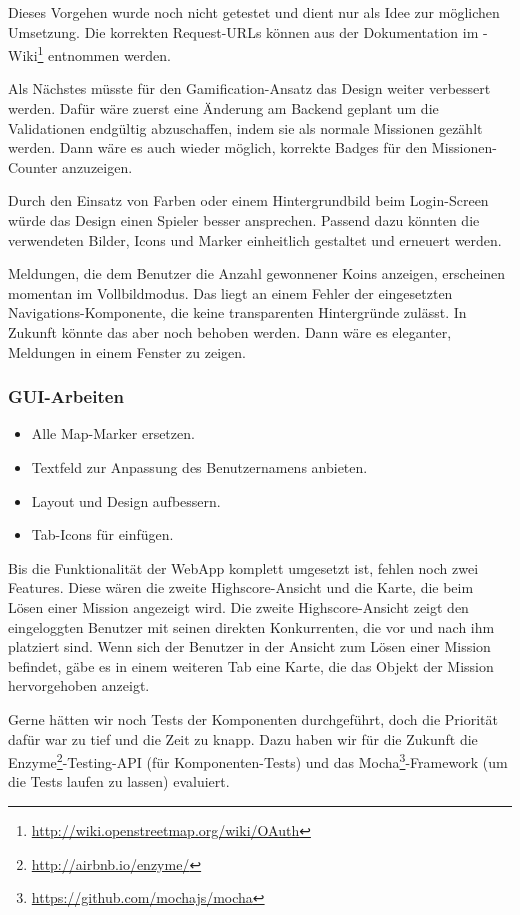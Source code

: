 Dieses Vorgehen wurde noch nicht getestet und dient nur als Idee zur möglichen Umsetzung.
Die korrekten Request-URLs können aus der Dokumentation im -Wiki\footnote{\url{http://wiki.openstreetmap.org/wiki/OAuth}} entnommen werden.

Als Nächstes müsste für den \gls{Gamification}-Ansatz das Design weiter verbessert werden. 
Dafür wäre zuerst eine Änderung am Backend geplant um die Validationen endgültig abzuschaffen, indem sie als normale Missionen gezählt werden. 
Dann wäre es auch wieder möglich, korrekte Badges für den Missionen-Counter anzuzeigen. 

Durch den Einsatz von Farben oder einem Hintergrundbild beim Login-Screen würde das Design einen Spieler besser ansprechen. 
Passend dazu könnten die verwendeten Bilder, Icons und Marker einheitlich gestaltet und erneuert werden. 

Meldungen, die dem Benutzer die Anzahl gewonnener Koins anzeigen, erscheinen momentan im Vollbildmodus. 
Das liegt an einem Fehler der eingesetzten Navigations-Komponente, die keine transparenten Hintergründe zulässt. 
In Zukunft könnte das aber noch behoben werden. 
Dann wäre es eleganter, Meldungen in einem Fenster zu zeigen.

\subsubsection{GUI-Arbeiten}
\begin{itemize}
	\item Alle Map-Marker ersetzen.
	\item Textfeld zur Anpassung des Benutzernamens anbieten.
	\item Layout und Design aufbessern.
	\item Tab-Icons für  einfügen.
\end{itemize}

Bis die Funktionalität der \gls{WebApp} komplett umgesetzt ist, fehlen noch zwei Features. 
Diese wären die zweite Highscore-Ansicht und die Karte, die beim Lösen einer Mission angezeigt wird. 
Die zweite Highscore-Ansicht zeigt den eingeloggten Benutzer mit seinen direkten Konkurrenten, die vor und nach ihm platziert sind. 
Wenn sich der Benutzer in der Ansicht zum Lösen einer Mission befindet, gäbe es in einem weiteren Tab eine Karte, die das Objekt der Mission hervorgehoben anzeigt. 

Gerne hätten wir noch Tests der Komponenten durchgeführt, doch die Priorität dafür war zu tief und die Zeit zu knapp. 
Dazu haben wir für die Zukunft die Enzyme\footnote{\url{http://airbnb.io/enzyme/}}-Testing-API (für Komponenten-Tests) und das Mocha\footnote{\url{https://github.com/mochajs/mocha}}-\gls{Framework} (um die Tests laufen zu lassen) evaluiert.

